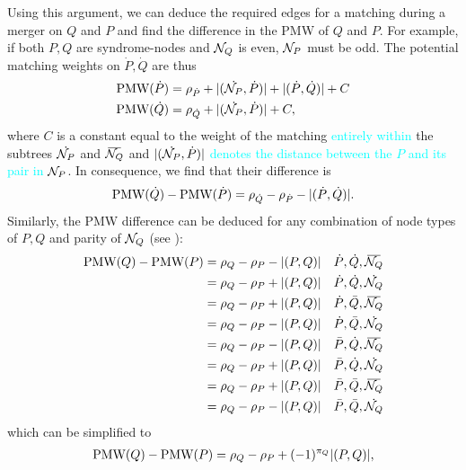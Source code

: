 Using this argument, we can deduce the required edges for a matching during a merger on $Q$ and $P$ and find the difference in the PMW of $Q$ and $P$. For example, if both $P,Q$ are syndrome-nodes and $\mathcal{N}_Q$ is even, $\mathcal{N}_P$ must be odd. The potential matching weights on $\dot{P},\dot{Q}$ are thus 
\begin{align*}
  \text{PMW}(\dot{P}) &= \rho_{\dot{P}} + \lvert(\dot{\mathcal{N}_P},\dot{P})\rvert + \lvert(\dot{P}, \dot{Q})\rvert + C \\
  \text{PMW}(\dot{Q}) &= \rho_{\dot{Q}} + \lvert(\dot{\mathcal{N}_P},\dot{P})\rvert + C,
\end{align*}
where $C$ is a constant equal to the weight of the matching \textcolor{cyan}{entirely within} the subtrees $\dot{\mathcal{N}_P}$ and $\overbar{\nset_Q}$ and \textcolor{cyan}{$\lvert(\dot{\mathcal{N}_P},\dot{P})\rvert$ denotes the distance between the $P$ and its pair in $\mathcal{N}_P$}. In consequence, we find that their difference is 
\begin{equation*}
  \text{PMW}(\dot{Q}) - \text{PMW}(\dot{P}) = \rho_{\dot{Q}} - \rho_{\dot{P}} - \lvert(\dot{P}, \dot{Q})\rvert.
\end{equation*}
Similarly, the PMW difference can be deduced for any combination of node types of $P,Q$ and parity of $\mathcal{N}_Q$ (see ):
\begin{align*}
  \text{PMW}({Q}) - \text{PMW}({P}) &= \rho_Q - \rho_P - \abs{(P,Q)}  &\dot{P}, \dot{Q}, \overbar{\nset_Q} \\
  &= \rho_Q - \rho_P + \abs{(P,Q)}  &\dot{P}, \dot{Q}, \dot{\nset_Q} \\
  &= \rho_Q - \rho_P + \abs{(P,Q)}  &\dot{P}, \bar{Q}, \overbar{\nset_Q} \\
  &= \rho_Q - \rho_P - \abs{(P,Q)}  &\dot{P}, \bar{Q}, \dot{\nset_Q} \\
  &= \rho_Q - \rho_P - \abs{(P,Q)}  &\bar{P}, \dot{Q}, \overbar{\nset_Q} \\
  &= \rho_Q - \rho_P + \abs{(P,Q)}  &\bar{P}, \dot{Q}, \dot{\nset_Q} \\
  &= \rho_Q - \rho_P + \abs{(P,Q)}  &\bar{P}, \bar{Q}, \overbar{\nset_Q} \\
  &= \rho_Q - \rho_P - \abs{(P,Q)}  &\bar{P}, \bar{Q}, \dot{\nset_Q} \\
\end{align*}
which can be simplified to 
\begin{multline}\label{eq:pmwdif}
    \text{PMW}({Q}) - \text{PMW}({P}) %
    =\rho_Q-\rho_P + (-1)^{\pi_Q}\abs{(P,Q)},%
\end{multline}
